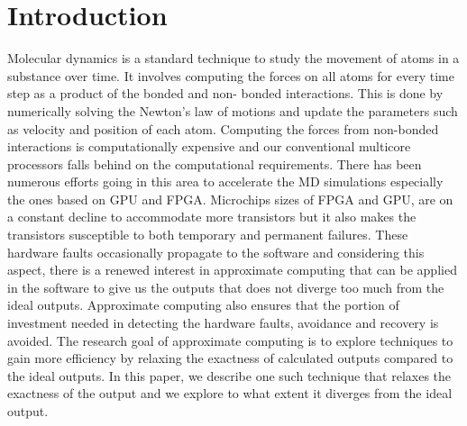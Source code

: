 \documentclass[aps,pre,twocolumn,showpacs,preprintnumbers,amsmath,amssymb]{revtex4-1}
\begin{document}
\date{\today}%


\begin{abstract}

\end{abstract}

\keywords{}%
\maketitle



\section{Introduction}
Molecular dynamics is a standard technique to study the movement of atoms in a substance over time.  It involves computing the forces on all atoms for every time step as a product of the bonded and non- bonded interactions. This is done by numerically solving the Newton's law of motions and update the parameters such as velocity and position of each atom. Computing the forces from non-bonded interactions is computationally expensive and our conventional multicore processors falls behind on the computational requirements. There has been numerous efforts going in this area to accelerate the MD simulations especially the ones based on GPU and FPGA.   
Microchips sizes of FPGA and GPU, are on a constant decline to accommodate more transistors but it also makes the transistors susceptible to both temporary and permanent failures. These hardware faults occasionally propagate to the software and considering this aspect, there is a renewed interest in approximate computing that can be applied in the software to give us the outputs that does not diverge too much from the ideal outputs. Approximate computing also ensures that the portion of investment needed in detecting the hardware faults, avoidance and recovery is avoided. The research goal of approximate computing is to explore techniques to gain more efficiency by relaxing the exactness of calculated outputs compared to the ideal outputs. In this paper, we describe one such technique that relaxes the exactness of the output and we explore to what extent it diverges from the ideal output.
\end{document}
